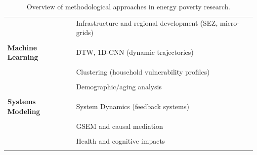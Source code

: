 \documentclass[11pt,a4paper]{article}
\begin{document}
\begin{table}[h!]
\begin{tabular}{p{3.3cm} p{8.5cm}}
& Infrastructure and regional development (SEZ, micro-grids) \\
& \cite{GONG2026115104, kone2023sez} \\

\midrule

\textbf{Machine Learning} 
& DTW, 1D-CNN (dynamic trajectories) \\
& \cite{BUDRIA2026104670} \\

& Clustering (household vulnerability profiles) \\
& \cite{CRETI2026109209, kaur2021timepoverty, njoku2022gendered} \\

& Demographic/aging analysis \\
& \cite{taylor2020pension, muller2021elderly, li2022transitioning} \\

\midrule

\textbf{Systems Modeling} 
& System Dynamics (feedback systems) \\
& \cite{ZARGHAMI2026127902} \\

& GSEM and causal mediation \\
& \cite{ULLAH2026115185, ADABOR2026115293} \\

& Health and cognitive impacts \\
& \cite{chen2023aging, lee2023cognitive} \\

\bottomrule
\end{tabular}
\caption{Overview of methodological approaches in energy poverty research.}
\label{tab:methods}
\end{table}
\end{document}
